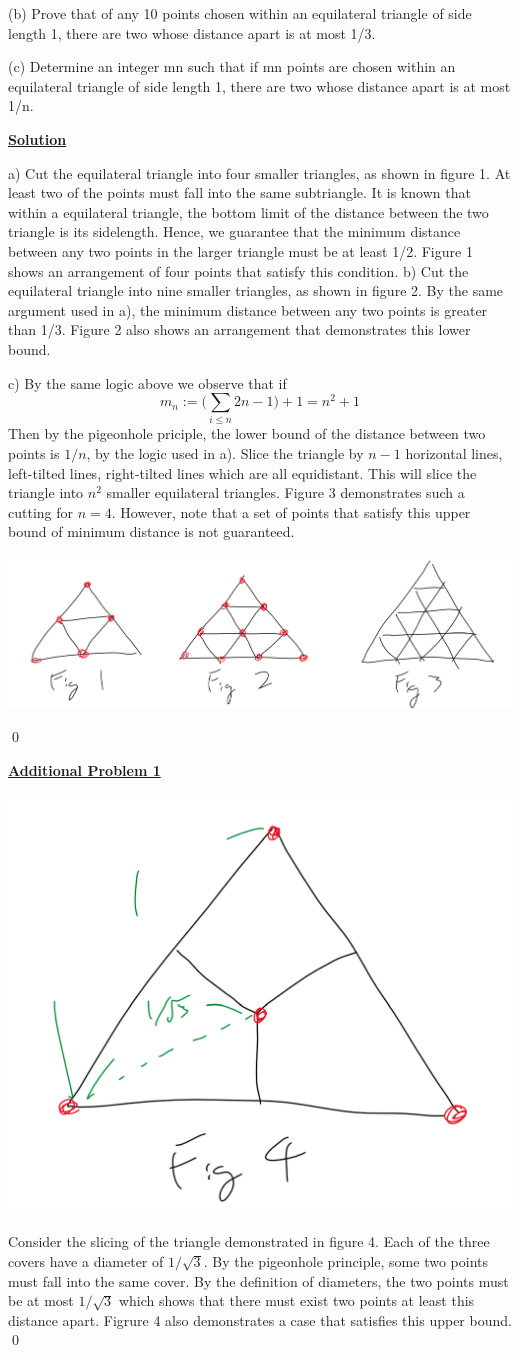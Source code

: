 \documentclass{article}
\newcommand{\new}[1]{
    \vspace{2mm}
    \noindent
    \textbf{
    \underline{#1}}
}
\begin{document}
(b) Prove that of any 10 points chosen within an equilateral triangle of side 
length 1, there are two whose distance apart is at most 1/3. 

(c) Determine an integer mn such that if mn points are chosen within an equilateral triangle of side length 1, there are two whose distance apart is at 
most 1/n. 

\new{Solution}

a) Cut the equilateral triangle into four smaller triangles, as shown 
in figure 1. At least two of the points must fall into the same subtriangle. 
It is known that within a equilateral triangle, the bottom limit of the distance 
between the two triangle is its sidelength. Hence, we guarantee that 
the minimum distance between any two points in the larger triangle must be 
at least 1/2. Figure 1 shows an arrangement of four points that 
satisfy this condition. 
b) Cut the equilateral triangle into nine smaller triangles, as shown 
in figure 2. By the same argument used in a), the minimum distance 
between any two points is greater than 1/3. Figure 2 also shows an arrangement 
that demonstrates this lower bound. 

c) By the same logic above we observe that if
\[
    m_n:= \bigg(\sum_{i \leq n}2n-1\bigg) +1= n^2+1 
\]
Then by the pigeonhole priciple, the lower bound of the distance
 between two points is $1/n$, by the logic used in a). Slice 
 the triangle by $n-1$ horizontal lines, left-tilted lines, 
 right-tilted lines which are all equidistant. This will slice 
 the triangle into $n^2$ smaller equilateral triangles. Figure 3 demonstrates
 such a cutting for $n = 4$. 
 However, 
 note that a set of points that satisfy this upper bound of minimum 
 distance is not guaranteed. 

 \begin{center}
\includegraphics[width = .5\linewidth]{Figures.png}
 \end{center}

 \hfill \qed

 \new{Additional Problem 1}


 \begin{center}
\includegraphics[width = .225\linewidth]{Figure2.png}
 \end{center}
Consider the slicing of the triangle demonstrated in figure 4. 
Each of the three covers have a diameter of $1/\sqrt{3}$. By the 
pigeonhole principle, some two points must fall into the same 
cover. By the definition of diameters, the two points must be 
at most $1/\sqrt{3}$ which shows that there must exist two 
points at least this distance apart. Figrure 4 also demonstrates 
a case that satisfies this upper bound. 
\hfill \qed
\end{document}
